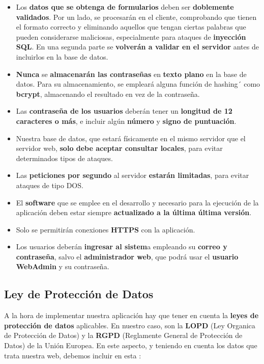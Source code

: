 \begin{itemize}
	\item Los \textbf{datos que se obtenga de formularios} deben ser \textbf{doblemente validados}. Por un lado, se procesarán en el cliente, comprobando que tienen el formato correcto y eliminando aquellos que tengan ciertas palabras que pueden considerarse maliciosas, especialmente para ataques de \textbf{inyección SQL}. En una segunda parte se \textbf{volverán a validar en el servidor} antes de incluirlos en la base de datos.
	
	\item \textbf{Nunca} se \textbf{almacenarán las contraseñas} en \textbf{texto plano} en la base de datos. Para su almacenamiento, se empleará alguna función de \gls{hashing}´ como \textbf{bcrypt}, almacenando el resultado en vez de la contraseña.
	
	\item Las \textbf{contraseña de los usuarios} deberán tener un \textbf{longitud de 12 caracteres o más}, e incluir algún \textbf{número} y \textbf{signo de puntuación}.
	
	\item Nuestra base de datos, que estará físicamente en el mismo servidor que el servidor web, \textbf{solo debe aceptar consultar locales}, para evitar determinados tipos de ataques. 
	
	\item Las \textbf{peticiones por segundo} al servidor \textbf{estarán limitadas}, para evitar ataques de tipo \gls{DOS}.
	
	\item El \textbf{software} que se emplee en el desarrollo y necesario para la ejecución de la aplicación deben estar siempre \textbf{actualizado a la última última versión}.
	
	\item Solo se permitirán conexiones \textbf{HTTPS} con la aplicación.
	
	\item Los usuarios deberán \textbf{ingresar al sistem}a empleando su \textbf{correo y contraseña}, salvo el \textbf{administrador web}, que podrá usar el \textbf{usuario WebAdmin} y su contraseña.
\end{itemize}

\subsection{Ley de Protección de Datos
}A la hora de implementar nuestra aplicación hay que tener en cuenta la \textbf{leyes de protección de datos} aplicables. En nuestro caso, son la \textbf{LOPD} (Ley Organica de Protección de Datos) y la \textbf{RGPD} (Reglamente General de Protección de Datos) de la Unión Europea. En este aspecto, y teniendo en cuenta los datos que trata nuestra web, debemos incluir en esta \cite{lopd}:


